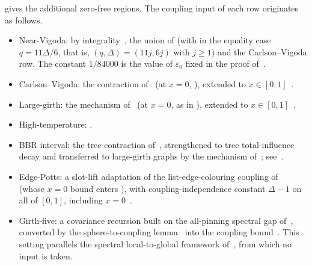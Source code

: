 \documentclass[11pt,reqno]{article}
\theoremstyle{plain}
\theoremstyle{definition}
\theoremstyle{remark}
\theoremstyle{definition}
\theoremstyle{remark}
\newcommand{\eps}{\varepsilon}
\newcommand{\Deg}{\Delta}                        %
\begin{document}
 gives the additional zero-free regions.
The coupling input of each row originates as follows.
\begin{itemize}[leftmargin=1.5em,itemsep=1pt]
  \item Near-Vigoda: by
        integrality~\cite[Lemma~4.3]{ShaoShi2026FurtherPotts}, the union
        of  (with \cite[Theorem~20]{CFFGZZ2024} in
        the equality case \(q=11\Deg/6\), that is,
        \((q,\Deg)=(11j,6j)\) with \(j\ge1\)) and the Carlson--Vigoda
        row.  The constant
        \(1/84000\) is the value of \(\eps_0\) fixed in the proof
        of~\cite[Theorem~5.1]{CDMPP2019}.
  \item Carlson--Vigoda: the contraction of~\cite{CarlsonVigoda2024}
        (at \(x=0\), \cite[Theorem~20]{CFFGZZ2024}), extended to
        \(x\in[0,1]\)~\cite[Theorem~5.1]{ShaoShi2026FurtherPotts}.
  \item Large-girth: the mechanism of~\cite{CLMM2023} (at \(x=0\), as in
        ), extended to
        \(x\in[0,1]\)~\cite[Theorem~6.1]{ShaoShi2026FurtherPotts}.
  \item High-temperature: .
  \item BBR interval: the tree contraction
        of~\cite{BencsBerrekkalRegts2025Trees}, strengthened to tree
        total-influence decay and transferred to large-girth graphs by
        the mechanism of~\cite{CLMM2023};
        see~\cite[Theorem~7.6]{ShaoShi2026FurtherPotts}.
  \item Edge-Potts: a slot-lift adaptation of the list-edge-colouring
        coupling of~\cite{CWZZ2025} (whose \(x=0\) bound enters
        ), with coupling-independence constant
        \(\Deg-1\) on all of \([0,1]\), including
        \(x=0\)~\cite[Theorem~8.1]{ShaoShi2026FurtherPotts}.
  \item Girth-five: a covariance recursion built on the all-pinning
        spectral gap of~\cite[Theorem~9.7]{ShaoShi2026FurtherPotts},
        converted by the sphere-to-coupling
        lemma~\cite[Lemma~5.13]{CLMM2023} into the coupling
        bound~\cite[Theorem~9.4]{ShaoShi2026FurtherPotts}.  This setting
        parallels the spectral local-to-global framework
        of~\cite{ChenLiu2026LocalGlobal}, from which no input is taken.
\end{itemize}
\end{document}
